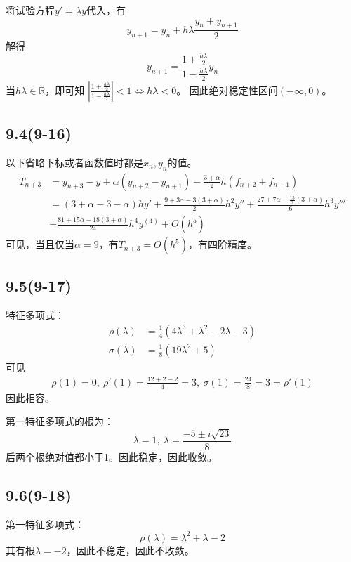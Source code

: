 \documentclass[UTF8,zihao=5]{ctexart}
\begin{document}
将试验方程$y'=\lambda y$代入，有
$$
    y_{n+1}=y_n+h\lambda\frac{y_n+y_{n+1}}{2}
$$
解得
$$
    y_{n+1}=\frac{1+\frac{h\lambda}{2}}{1-\frac{h\lambda}{2}}y_n
$$
当$h\lambda\in\mathbb{R}$，即可知
$\left|\frac{1+\frac{h\lambda}{2}}{1-\frac{h\lambda}{2}}\right|<1\Leftrightarrow h\lambda<0$。
因此绝对稳定性区间$(-\infty,0)$。

\subsection*{9.4(9-16)}

以下省略下标或者函数值时都是$x_n,y_n$的值。
$$
    \begin{aligned}
        T_{n+3}
         & =
        y_{n+3}-y+\alpha(y_{n+2}-y_{n+1})
        -\frac{3+\alpha}{2}h(f_{n+2}+f_{n+1})               \\
         & =
        (3+\alpha-3-\alpha)hy'
        +\frac{9+3\alpha-3(3+\alpha)}{2}h^2y''
        +\frac{27+7\alpha-\frac{15}{2}(3+\alpha)}{6}h^3y''' \\
         & +
        \frac{81+15\alpha-18(3+\alpha)}{24}h^4y^{(4)}
        +O(h^5)
    \end{aligned}
$$
可见，当且仅当$\alpha=9$，有$T_{n+3}=O(h^5)$，有四阶精度。

\subsection*{9.5(9-17)}

特征多项式：
$$
    \begin{aligned}
        \rho(\lambda)   & = \frac{1}{4}(4\lambda^3+\lambda^2-2\lambda-3) \\
        \sigma(\lambda) & = \frac{1}{8}(19\lambda^2+5)
    \end{aligned}
$$
可见
$$
\begin{aligned}
    \rho(1)=0,\ \rho'(1)=\frac{12+2-2}{4}=3,\ 
    \sigma(1)=\frac{24}{8}=3=\rho'(1)
\end{aligned}
$$
因此相容。

第一特征多项式的根为：
$$
\lambda=1,\ \lambda=\frac{-5\pm i\sqrt{23}}{8}
$$
后两个根绝对值都小于1。因此稳定，因此收敛。


\subsection*{9.6(9-18)}

第一特征多项式：
$$
\rho(\lambda)=\lambda^2+\lambda-2
$$
其有根$\lambda=-2$，因此不稳定，因此不收敛。
\end{document}
